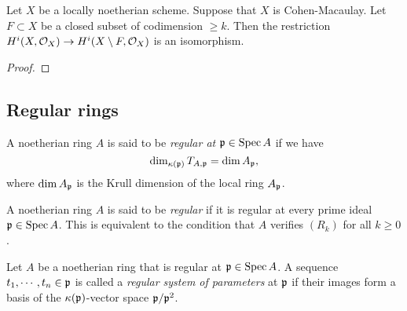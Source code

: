     \begin{theorem}\label{thm: higher dimensional hartogs lemma for Cohen-Macaulay schemes}
        Let $X$ be a locally noetherian scheme.
        Suppose that $X$ is Cohen-Macaulay.
        Let $F \subset X$ be a closed subset of codimension $\geq k$.
        Then the restriction $H^i(X,{\mathcal{O}}_X) \to H^i(X\setminus F, {\mathcal{O}}_{X})$ is an isomorphism.
    \end{theorem}
    \begin{proof}
    \end{proof}

    
\subsection{Regular rings}





    \begin{definition}\label{def: regular ring}
        A noetherian ring \(A\) is said to be \emph{regular at \({\mathfrak{p}} \in \operatorname{Spec} A\)} if we have 
        \[ \dim_{{\kappa}({\mathfrak{p}})} T_{A,{\mathfrak{p}}} = \dim A_{\mathfrak{p}}, \]
        where \(\dim A_{\mathfrak{p}}\) is the Krull dimension of the local ring \(A_{\mathfrak{p}}\).
        
        A noetherian ring \(A\) is said to be \emph{regular} if it is regular at every prime ideal \({\mathfrak{p}} \in \operatorname{Spec} A\).
        This is equivalent to the condition that \(A\) verifies \((R_k)\) for all \(k \geq 0\).
    \end{definition}

    \begin{definition}\label{def: regular system of parameters}
        Let \(A\) be a noetherian ring that is regular at \({\mathfrak{p}} \in \operatorname{Spec} A\).
        A sequence \(t_1,\cdots,t_n \in {\mathfrak{p}}\) is called a \emph{regular system of parameters} at \({\mathfrak{p}}\) if their images form a basis of the \({\kappa}({\mathfrak{p}})\)-vector space \({\mathfrak{p}}/{\mathfrak{p}}^2\).
    \end{definition}

